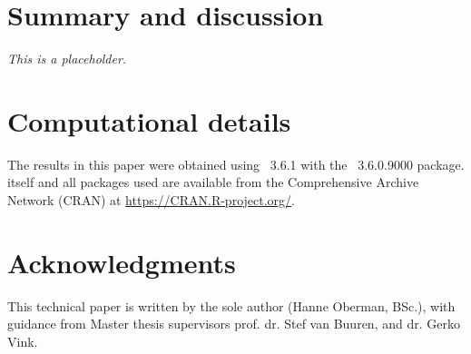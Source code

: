 \documentclass[article]{jss}
\begin{document}

\section{Summary and discussion} \label{sec:summary}

\emph{This is a placeholder.}




\section*{Computational details}


The results in this paper were obtained using ~3.6.1 with the ~3.6.0.9000 package.  itself and all packages used are available from the Comprehensive  Archive Network (CRAN) at \url{https://CRAN.R-project.org/}.


\section*{Acknowledgments}


This technical paper is written by the sole author (Hanne Oberman, BSc.), with guidance from Master thesis supervisors prof. dr. Stef van Buuren, and dr. Gerko Vink.
\end{document}
